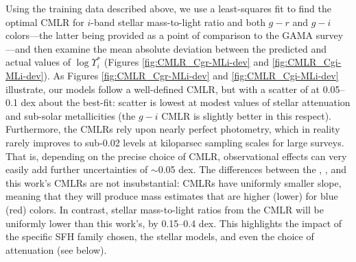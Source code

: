 Using the training data described above, we use a least-squares fit to find the optimal CMLR for $i$-band stellar mass-to-light ratio and both $g-r$ and $g-i$ colors---the latter being provided as a point of comparison to the GAMA survey \citep{taylor_gama_cmlrs}---and then examine the mean absolute deviation between the predicted and actual values of $\log \Upsilon^*_i$ (Figures \ref{fig:CMLR_Cgr-MLi-dev} and \ref{fig:CMLR_Cgi-MLi-dev}). As Figures \ref{fig:CMLR_Cgr-MLi-dev} and \ref{fig:CMLR_Cgi-MLi-dev} illustrate, our models follow a well-defined CMLR, but with a scatter of at 0.05--0.1 dex about the best-fit: scatter is lowest at modest values of stellar attenuation and sub-solar metallicities (the $g-i$ CMLR is slightly better in this respect). Furthermore, the CMLRs rely upon nearly perfect photometry, which in reality rarely improves to sub-0.02 levels at kiloparsec sampling scales for large surveys. That is, depending on the precise choice of CMLR, observational effects can very easily add further uncertainties of $\sim$0.05 dex. The differences between the \citet{bell_03}, \citet{taylor_gama_cmlrs}, and this work's CMLRs are not insubstantial: \citet{bell_03} CMLRs have uniformly smaller slope, meaning that they will produce mass estimates that are higher (lower) for blue (red) colors. In contrast, stellar mass-to-light ratios from the \citet{taylor_gama_cmlrs} CMLR will be uniformly lower than this work's, by 0.15--0.4 dex. This highlights the impact of the specific SFH family chosen, the stellar models, and even the choice of attenuation (see below).


